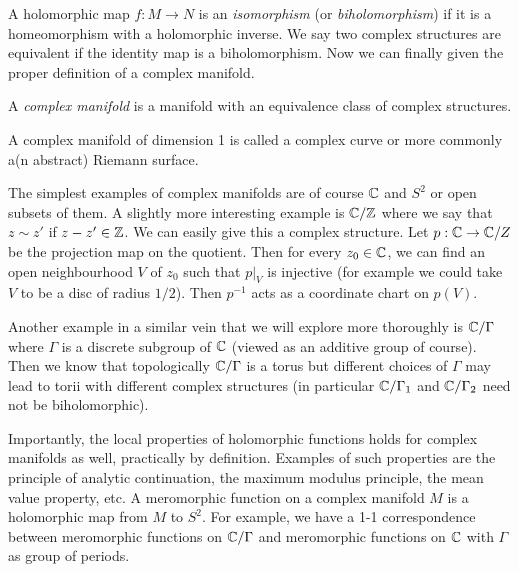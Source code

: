 A holomorphic map $f: M \to N$ is an \textit{isomorphism} (or \textit{biholomorphism}) if it is a homeomorphism with a holomorphic inverse. We say two complex structures are equivalent if the identity map is a biholomorphism. Now we can finally given the proper definition of a complex manifold. 
\begin{definition}
    A \textit{complex manifold} is a manifold with an equivalence class of complex structures.
\end{definition}
A complex manifold of dimension 1 is called a complex curve or more commonly a(n abstract) Riemann surface. 

The simplest examples of complex manifolds are of course $\mathbb{C}$ and $S^2$ or open subsets of them. A slightly more interesting example is $\mathbb{C}/\mathbb{Z}$ where we say that $z \sim z'$ if $z - z' \in \mathbb{Z}$. We can easily give this a complex structure. Let $p: \mathbb{C} \to \mathbb{C}/Z$ be the projection map on the quotient. Then for every $z_0 \in \mathbb{C}$, we can find an open neighbourhood $V$ of $z_0$ such that $p|_V$ is injective (for example we could take $V$ to be a disc of radius $1/2$). Then $p^{-1}$ acts as a coordinate chart on $p(V)$. 

Another example in a similar vein that we will explore more thoroughly is $\mathbb{C}/\Gamma$ where $\Gamma$ is a discrete subgroup of $\mathbb{C}$ (viewed as an additive group of course). Then we know that topologically $\mathbb{C}/\Gamma$ is a torus but different choices of $\Gamma$ may lead to torii with different complex structures (in particular $\mathbb{C}/\Gamma_1$ and $\mathbb{C}/\Gamma_2$ need not be biholomorphic). 

Importantly, the local properties of holomorphic functions holds for complex manifolds as well, practically by definition. Examples of such properties are the principle of analytic continuation, the maximum modulus principle, the mean value property, etc. A meromorphic function on a complex manifold $M$ is a holomorphic map from $M$ to $S^2$. For example, we have a 1-1 correspondence between meromorphic functions on $\mathbb{C}/\Gamma$ and meromorphic functions on $\mathbb{C}$ with $\Gamma$ as group of periods. 


